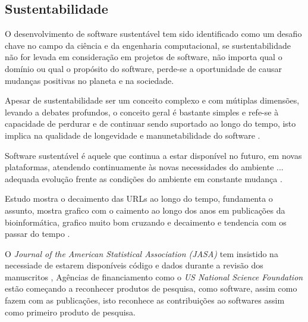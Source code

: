 
\subsection{Sustentabilidade}

O desenvolvimento de software sustentável tem sido identificado como um desafio
chave no campo da ciência e da engenharia computacional, se sustentabilidade
não for levada em consideração em projetos de software, não importa qual o
domínio ou qual o propósito do software, perde-se a oportunidade de causar
mudanças positivas no planeta e na sociedade.

Apesar de sustentabilidade ser um conceito complexo e com mútiplas dimensões,
levando a debates profundos, o conceito geral é bastante simples e refe-se à
capacidade de perdurar e de continuar sendo suportado ao longo do tempo, isto
implica na qualidade de longevidade e manunetabilidade do software
\cite{venters2014software}.

Software sustentável é aquele que continua a estar disponível no futuro, em
novas plataformas, atendendo continuamente às novas necessidades do ambiente
... adequada evolução frente as condições do ambiente em constante mudança
\cite{allen2017engineering}.

Estudo mostra o decaimento das URLs ao longo do tempo, fundamenta o assunto,
mostra grafico com o caimento ao longo dos anos em publicações da
bioinformática, grafico muito bom cruzando e decaimento e tendencia com os
passar do tempo \cite{wren2017use}.


O {\it Journal of the American Statistical Association (JASA)} tem insistido na
necessiade de estarem disponíveis código e dados durante a revisão dos
manuscritos \cite{baker2016scientists}, Agências de financiamento como o {\it
US National Science Foundation} estão começando a reconhecer produtos de
pesquisa, como software, assim como fazem com as publicações, isto reconhece as
contribuições ao softwares assim como primeiro produto de pesquisa.

